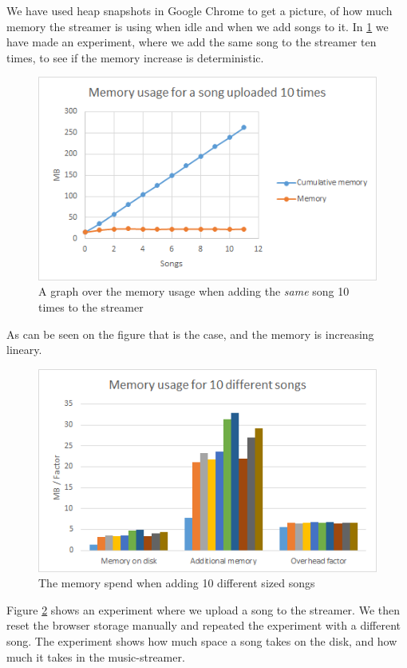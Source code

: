 We have used heap snapshots in Google Chrome to get a picture,
of how much memory the streamer is using when idle and when we add songs to it. 
In \ref{fig:memoryUsage} we have made an experiment,
where we add the same song to the streamer ten times,
to see if the memory increase is deterministic.

\begin{figure}[H]
	\centering
	\includegraphics[scale=0.9]{gfx/memoryUsage}
    \caption{A graph over the memory usage when adding the {\em same} song 10 times to the streamer}
	\label{fig:memoryUsage}
\end{figure}
\noindent
As can be seen on the figure that is the case, and the memory is increasing lineary.

\begin{figure}[H]
	\centering
	\includegraphics[scale=0.9]{gfx/memoryDiffSize}
	\caption{The memory spend when adding 10 different sized songs}
	\label{fig:memoryDiffSizes}
\end{figure}
\noindent
Figure \ref{fig:memoryDiffSizes} shows an experiment where we upload a song to the streamer. 
We then reset the browser storage manually and repeated the experiment with a different song.
The experiment shows how much space a song takes on the disk,
and how much it takes in the music-streamer.

